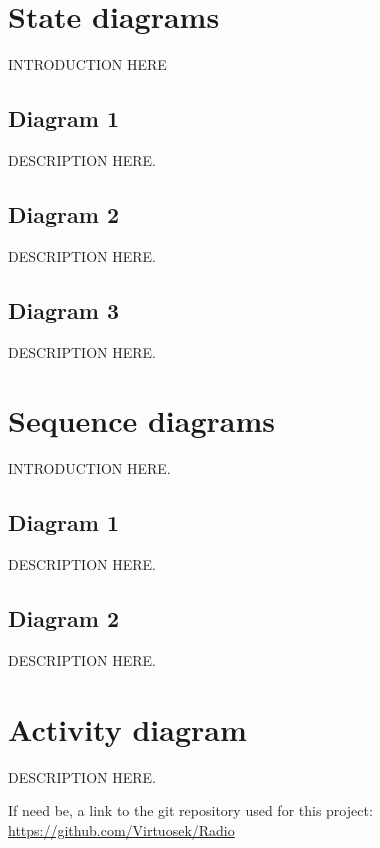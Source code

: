 \documentclass[11pt]{article}
\begin{document}
\pagebreak
\section{State diagrams}
INTRODUCTION HERE
\subsection{Diagram 1}
\vspace{10px}
\begin{center}
\end{center}
DESCRIPTION HERE.

\subsection{Diagram 2}
\vspace{10px}
\begin{center}
\end{center}
DESCRIPTION HERE.

\subsection{Diagram 3}
\vspace{10px}
\begin{center}
\end{center}
DESCRIPTION HERE.

\pagebreak
\section{Sequence diagrams}
INTRODUCTION HERE.
\subsection{Diagram 1}
\vspace{10px}
\begin{center}
\end{center}
DESCRIPTION HERE.
\subsection{Diagram 2}
\vspace{10px}
\begin{center}
\end{center}
DESCRIPTION HERE.

\pagebreak
\section{Activity diagram}
\vspace{10px}
\begin{center}
\end{center}
DESCRIPTION HERE.


\pagebreak
If need be, a link to the git repository used for this project:\\
\url{https://github.com/Virtuosek/Radio}
\end{document}
